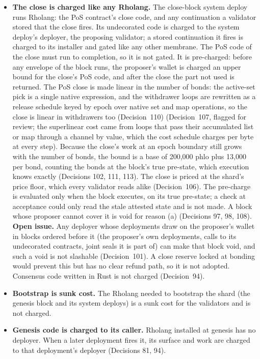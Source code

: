 \documentclass[11pt]{article}
\begin{document}
\begin{itemize}
\item \textbf{The close is charged like any Rholang.} The close-block system deploy runs Rholang: the PoS contract's close code, and any continuation a validator stored that the close fires. Its undecorated code is charged to the system deploy's deployer, the proposing validator; a stored continuation it fires is charged to its installer and gated like any other membrane. The PoS code of the close must run to completion, so it is not gated. It is pre-charged: before any envelope of the block runs, the proposer's wallet is charged an upper bound for the close's PoS code, and after the close the part not used is returned. The PoS close is made linear in the number of bonds: the active-set pick is a single native expression, and the withdrawer loops are rewritten as a release schedule keyed by epoch over native set and map operations, so the close is linear in withdrawers too (Decision~110) (Decision~107, flagged for review; the superlinear cost came from loops that pass their accumulated list or map through a channel by value, which the cost schedule charges per byte at every step). Because the close's work at an epoch boundary still grows with the number of bonds, the bound is a base of 200{,}000 phlo plus 13{,}000 per bond, counting the bonds at the block's true pre-state, which execution knows exactly (Decisions 102, 111, 113). The close is priced at the shard's price floor, which every validator reads alike (Decision~106). The pre-charge is evaluated only when the block executes, on its true pre-state; a check at acceptance could only read the stale attested state and is not made. A block whose proposer cannot cover it is void for reason (a) (Decisions 97, 98, 108). \textbf{Open issue.} Any deployer whose deployments draw on the proposer's wallet in blocks ordered before it (the proposer's own deployments, calls to its undecorated contracts, joint seals it is part of) can make that block void, and such a void is not slashable (Decision~101). A close reserve locked at bonding would prevent this but has no clear refund path, so it is not adopted. Consensus code written in Rust is not charged (Decision~94).
\item \textbf{Bootstrap is sunk cost.} The Rholang needed to bootstrap the shard (the genesis block and its system deploys) is a sunk cost for the validators and is not charged.
\item \textbf{Genesis code is charged to its caller.} Rholang installed at genesis has no deployer. When a later deployment fires it, its surface and work are charged to that deployment's deployer (Decisions 81, 94).

\end{itemize}
\end{document}
